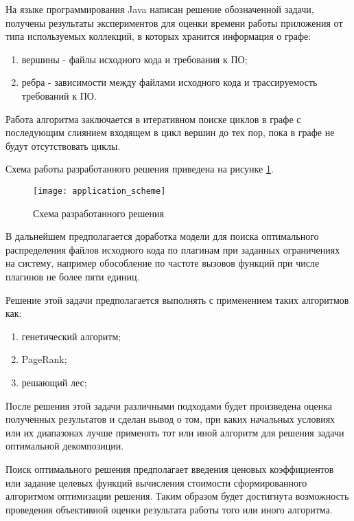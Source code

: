 На языке программирования Java написан решение обозначенной задачи, получены результаты экспериментов для оценки времени работы приложения от типа используемых коллекций, в которых хранится информация о графе:
\begin{enumerate}
    \item вершины - файлы исходного кода и требования к ПО;
    \item ребра - зависимости между файлами исходного кода и трассируемость требований к ПО.
\end{enumerate}

Работа алгоритма заключается в итеративном поиске циклов в графе с последующим слиянием входящем в цикл вершин до тех пор, пока в графе не будут отсутствовать циклы.

Схема работы разработанного решения приведена на рисунке \ref{fig:application_scheme}.

\begin{figure}[H]
    \centering
    \texttt{[image: application\_scheme]}
    \caption{Схема разработанного решения}
    \label{fig:application_scheme}
\end{figure}

В дальнейшем предполагается доработка модели для поиска оптимального распределения файлов исходного кода по плагинам при заданных ограничениях на систему, например обособление по частоте вызовов функций при числе плагинов не более пяти единиц.

Решение этой задачи предполагается выполнять с применением таких алгоритмов как:
\begin{enumerate}
    \item генетический алгоритм;
    \item PageRank;
    \item решающий лес;
\end{enumerate}

После решения этой задачи различными подходами будет произведена оценка полученных результатов и сделан вывод о том, при каких начальных условиях или их диапазонах лучше применять тот или иной алгоритм для решения задачи оптимальной декомпозиции.

Поиск оптимального решения предполагает введения ценовых коэффициентов или задание целевых функций вычисления стоимости сформированного алгоритмом оптимизации решения. Таким образом будет достигнута возможность проведения объективной оценки результата работы того или иного алгоритма.